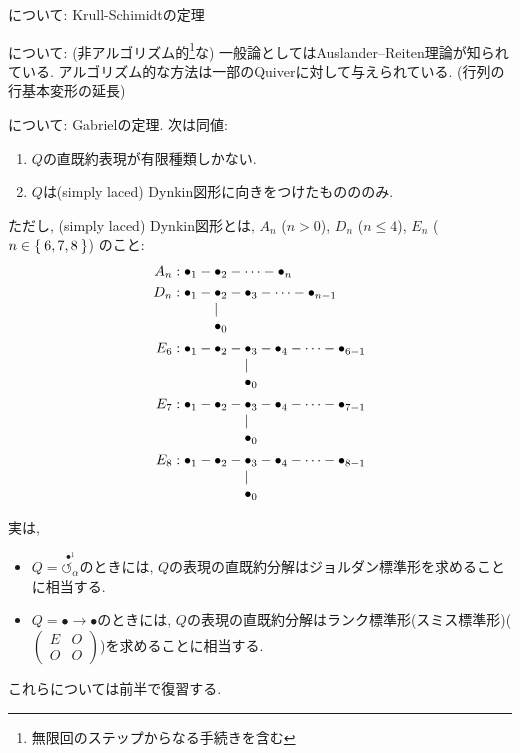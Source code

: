 について:
Krull-Schimidtの定理%

について:
(非アルゴリズム的\footnote{無限回のステップからなる手続きを含む}な)
一般論としてはAuslander--Reiten理論が知られている.
アルゴリズム的な方法は一部のQuiverに対して与えられている.
(行列の行基本変形の延長)

について:
Gabrielの定理.
次は同値:
\begin{enumerate}
\item
  $Q$の直既約表現が有限種類しかない.
\item
  $Q$は(simply laced) Dynkin図形に向きをつけたものののみ.
\end{enumerate}
ただし, (simply laced) Dynkin図形とは,
$A_n$ ($n>0$), $D_n$ ($n\leq 4$), $E_n$ ($n\in\Set{6,7,8}$)
のこと:
  \begin{align*}
    A_n &: \bullet_1 -\bullet_2-\cdots -\bullet_n\\
    D_n &: \bullet_1 -\!\!\!\begin{array}[t]{l}\bullet_2\\|\\\bullet_0\end{array}\!\!\!-\bullet_3-\cdots -\bullet_{n-1}\\
    E_6 &: \bullet_1-\bullet_2 -\!\!\!\begin{array}[t]{l}\bullet_3\\|\\\bullet_0\end{array}\!\!\!-\bullet_4-\cdots -\bullet_{6-1}\\
    E_7 &: \bullet_1-\bullet_2 -\!\!\!\begin{array}[t]{l}\bullet_3\\|\\\bullet_0\end{array}\!\!\!-\bullet_4-\cdots -\bullet_{7-1}\\
    E_8 &: \bullet_1-\bullet_2 -\!\!\!\begin{array}[t]{l}\bullet_3\\|\\\bullet_0\end{array}\!\!\!-\bullet_4-\cdots -\bullet_{8-1}\\
  \end{align*}


実は, 
\begin{itemize}
\item
  $Q=\stackrel{\bullet^{1}}{\circlearrowleft_{\alpha}}$のときには,
  $Q$の表現の直既約分解はジョルダン標準形を求めることに相当する.
\item
  $Q=\bullet\to\bullet$のときには,
  $Q$の表現の直既約分解はランク標準形(スミス標準形)($\begin{pmatrix}E&O\\O&O\end{pmatrix}$)を求めることに相当する.
\end{itemize}
これらについては前半で復習する.


